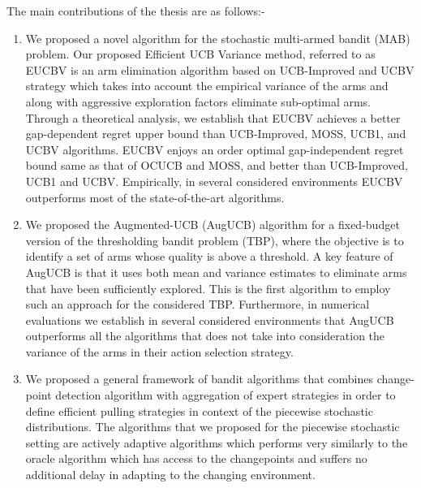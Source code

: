 The main contributions of the thesis are as follows:-
\begin{enumerate}
\item We proposed a novel algorithm for the stochastic multi-armed bandit (MAB) problem. Our proposed Efficient UCB Variance method, referred to as EUCBV is an arm elimination algorithm based on UCB-Improved and UCBV strategy which takes into account the empirical variance of the arms and along with aggressive exploration factors eliminate sub-optimal arms. Through a theoretical analysis, we establish that EUCBV achieves a better gap-dependent regret upper bound than UCB-Improved, MOSS, UCB1, and UCBV algorithms. EUCBV enjoys an order optimal gap-independent regret bound same as that of OCUCB and MOSS, and better than UCB-Improved, UCB1 and UCBV. Empirically, in several considered environments EUCBV outperforms most of the state-of-the-art algorithms. 

\item We proposed the Augmented-UCB (AugUCB) algorithm for a fixed-budget version of the thresholding bandit problem (TBP), where the objective is to identify a set of arms whose quality is above a threshold. A key feature of AugUCB is that it uses both mean and variance estimates to eliminate arms that have been sufficiently explored. This is the first algorithm to employ such an approach for the considered TBP. Furthermore, in numerical evaluations we establish in several considered environments that AugUCB outperforms all the algorithms that does not take into consideration the variance of the arms in their action selection strategy.

\item We proposed a general framework of bandit algorithms that combines change-point detection algorithm with aggregation of expert strategies in order to define efficient pulling strategies in context of the piecewise stochastic  distributions. The algorithms that we proposed for the piecewise stochastic setting are actively adaptive algorithms which performs very similarly to the oracle algorithm which has access to the changepoints and suffers no additional delay in adapting to the changing environment. 
\end{enumerate}
 